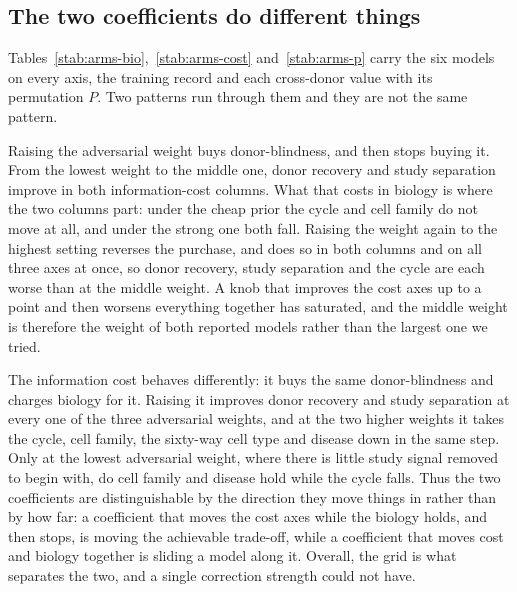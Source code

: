 \subsection{The two coefficients do different things}

Tables~\ref{stab:arms-bio},~\ref{stab:arms-cost}
and~\ref{stab:arms-p} carry the six models on every axis, the training
record and each cross-donor value with its permutation $P$. Two patterns
run through them and they are not the same pattern.

Raising the adversarial weight buys donor-blindness, and then stops buying
it. From the lowest weight to the middle one, donor recovery and study
separation improve in both information-cost columns. What that costs in
biology is where the two columns part: under the cheap prior the cycle and
cell family do not move at all, and under the strong one both fall. Raising
the weight again to the highest setting reverses the purchase, and does so
in both columns and on all three axes at once, so donor recovery, study
separation and the cycle are each worse than at the middle weight. A knob
that improves the cost axes up to a point and then worsens everything
together has saturated, and the middle weight is therefore the weight of
both reported models rather than the largest one we tried.

The information cost behaves differently: it buys the same donor-blindness
and charges biology for it. Raising it improves donor recovery and study
separation at every one of the three adversarial weights, and at the two
higher weights it takes the cycle, cell family, the sixty-way cell type and
disease down in the same step. Only at the lowest adversarial weight, where
there is little study signal removed to begin with, do cell family and
disease hold while the cycle falls. Thus the two coefficients are
distinguishable by the direction they move things in rather than by how
far: a coefficient that moves the cost axes while the biology holds, and
then stops, is moving the achievable trade-off, while a coefficient that
moves cost and biology together is sliding a model along it. Overall, the
grid is what separates the two, and a single correction strength could not
have.

\begin{table}[p]
\centering
\caption[Every arm, biological axes]{\textbf{The six frontier models and
the five ablations on the biological axes.} Cross-donor excess agreement
for the cycle, cell family, merged severity, rASRM stage \citep{asrm1997revised} and grade; $k$NN
agreement for the sixty-way cell type and for cell-cycle phase; pooled
control-against-eutopic agreement for disease. All on the 416{,}256-cell
held-out split.}
\label{stab:arms-bio}
\footnotesize\setlength{\tabcolsep}{3.5pt}

\end{table}

